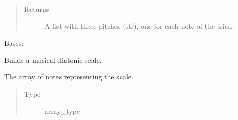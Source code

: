 \documentclass[letterpaper,10pt,english]{sphinxmanual}
\begin{document}
\begin{fulllineitems}
\begin{fulllineitems}
\begin{quote}
\begin{description}
\begin{itemize}
\end{itemize}

\item[{Returns}] \leavevmode
A list with three pitches (str), one for each note of the triad.

\end{description}\end{quote}

\end{fulllineitems}


\end{fulllineitems}


\begin{fulllineitems}
\label{\detokenize{birdears:birdears.scale.DiatonicScale}}
Bases: {\hyperref[\detokenize{index:birdears.scale.ScaleBase}]{}}

Builds a musical diatonic scale.

\begin{fulllineitems}
\label{\detokenize{birdears:birdears.scale.DiatonicScale.scale}}
The array of notes representing the scale.
\begin{quote}\begin{description}
\item[{Type}] \leavevmode
array\_type

\end{description}\end{quote}

\end{fulllineitems}



\end{fulllineitems}
\end{document}
